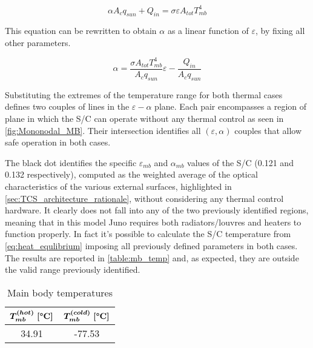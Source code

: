 \begin{equation}
    \alpha A_c q_{sun} + Q_{in} = \sigma \varepsilon A_{tot} T_{mb}^4
    \label{eq:heat_equlibrium}
\end{equation}  

This equation can be rewritten to obtain $\alpha$ as a linear function of $\varepsilon$, by fixing all other parameters.

\begin{equation}
    \alpha = \frac{\sigma A_{tot} T_{mb}^4}{A_c q_{sun}}\varepsilon - \frac{Q_{in}}{A_c q_{sun}}
    \label{eq:eps_alpha_relation}
\end{equation}

Substituting the extremes of the temperature range for both thermal cases defines two couples of lines in the $\varepsilon-\alpha$ plane. Each pair encompasses a region of plane in which the S/C can operate without any thermal control as seen in \autoref{fig:Mononodal_MB}. Their intersection identifies all $(\varepsilon, \alpha)$ couples that allow safe operation in both cases.


\vspace*{-3mm}

The black dot identifies the specific $\varepsilon_{mb}$ and $\alpha_{mb}$ values of the S/C (0.121 and 0.132 respectively), computed as the weighted average of the optical characteristics of the various external surfaces, highlighted in \autoref{sec:TCS_architecture_rationale}, without considering any thermal control hardware. It clearly does not fall into any of the two previously identified regions, meaning that in this model Juno requires both radiators/louvres and heaters to function properly. In fact it's possible to calculate the S/C temperature from \autoref{eq:heat_equlibrium} imposing all previously defined parameters in both cases. The results are reported in \autoref{table:mb_temp} and, as expected, they are outside the valid range previously identified.

\begin{table}[H]
    \renewcommand{\arraystretch}{1.5}
    \centering
    \begin{tabular}{|c|c|}
        \hline
        $\boldsymbol{T_{mb}^{(hot)} \; [\textrm{\textbf{°C}}]}$ & $\boldsymbol{T_{mb}^{(cold)} \; [\textrm{\textbf{°C}}]}$ \\
        \hline
        \hline
        34.91 & -77.53 \\
        \hline
    \end{tabular}
    \caption{Main body temperatures}
    \label{table:mb_temp}
\end{table}

